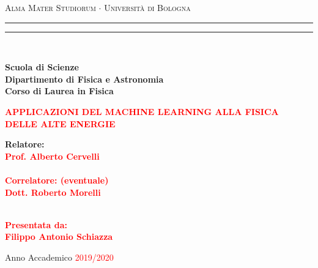 \documentclass[12pt,a4paper]{report}
\begin{document}
	\begin{titlepage}
		\begin{center}
			{{\Large{\textsc{Alma Mater Studiorum $\cdot$ Universit\`a di Bologna}}}} 
			\rule[0.1cm]{15.8cm}{0.1mm}
			\rule[0.5cm]{15.8cm}{0.6mm}
			\\\vspace{3mm}
			
			{\small{\bf Scuola di Scienze \\ 
					Dipartimento di Fisica e Astronomia\\
					Corso di Laurea in Fisica}}
			
		\end{center}
		
		\vspace{23mm}
		
		\begin{center}\textcolor{red}{
				{\LARGE{\bf APPLICAZIONI DEL MACHINE LEARNING ALLA FISICA DELLE ALTE ENERGIE}}\\
		}\end{center}
		
		\vspace{50mm} \par \noindent
		
		\begin{minipage}[t]{0.47\textwidth}
			{\large{\bf Relatore: \vspace{2mm}\\\textcolor{red}{
						Prof. Alberto Cervelli}\\\\
					\textcolor{red}{
						\bf Correlatore: (eventuale)
						\vspace{2mm}\\
						Dott. Roberto Morelli\\\\}}}
		\end{minipage}
		\hfill
		\begin{minipage}[t]{0.47\textwidth}\raggedleft \textcolor{red}{
				{\large{\bf Presentata da:
						\vspace{2mm}\\
						Filippo Antonio Schiazza}}}
		\end{minipage}
		
		\vspace{40mm}
		
		\begin{center}
			Anno Accademico \textcolor{red}{ 2019/2020}
		\end{center}
		
	\end{titlepage}  
\end{document}
